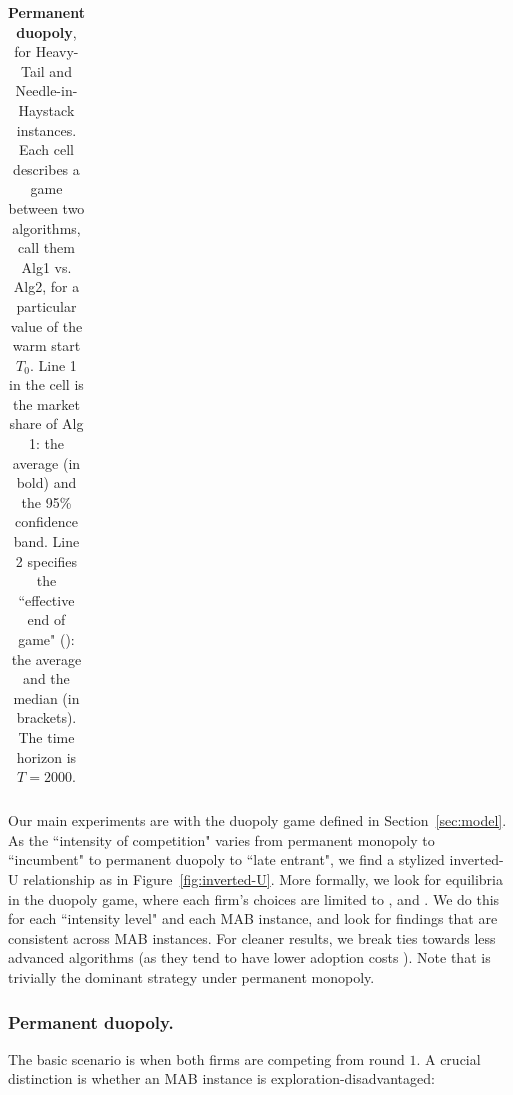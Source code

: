 \documentclass[../competing_bandits_with_appendix.tex]{subfiles}
\begin{document}
\begin{table}[t]
\begin{tabular}{|c|c|c|c||c|c|c|}
  \\
   \hline
\end{tabular}
\caption{{\bf Permanent duopoly}, for Heavy-Tail and Needle-in-Haystack instances. Each cell describes a game between two algorithms, call them Alg1 vs. Alg2, for a particular value of the warm start $T_0$. Line 1 in the cell is the market share of Alg 1: the average (in bold) and the 95\% confidence band.
Line 2 specifies the ``effective end of game" (\Eeog): the average and the median (in brackets). The time horizon is $T=2000$.}
\label{sim_table}
\end{table}

Our main experiments are with the duopoly game defined in Section~\ref{sec:model}. As the ``intensity of competition" varies from permanent monopoly to ``incumbent" to permanent duopoly to ``late entrant", we find a stylized inverted-U relationship as in Figure~\ref{fig:inverted-U}. More formally, we look for equilibria in the duopoly game, where each firm's choices are limited to \DG, \DEG and \TS. We do this for each ``intensity level" and each MAB instance, and look for findings that are consistent across MAB instances. For cleaner results, we break ties towards less advanced algorithms (as they tend to have lower adoption costs \cite{MWT-WhitePaper-2016,DS-arxiv}). Note that \DG is trivially the dominant strategy under permanent monopoly.



\subsubsection{Permanent duopoly.}
The basic scenario is when both firms are competing from round $1$. A crucial distinction is whether an MAB instance is exploration-disadvantaged:
\end{document}
